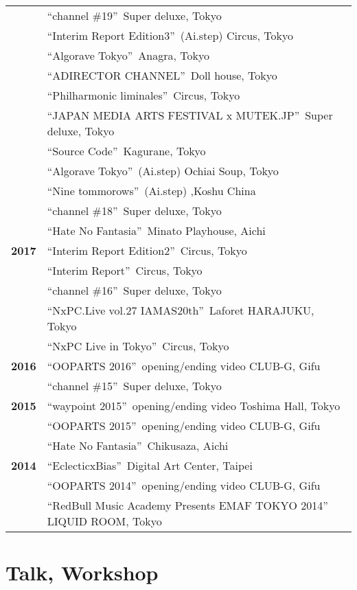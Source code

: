\documentclass[8pt,a4paper]{article}
\begin{document}
\begin{longtable}{@{}p{1.2cm}@{\hspace{0.5cm}}p{14cm}@{}}
& ``channel \#19''\, Super deluxe, Tokyo \\
& ``Interim Report Edition3''\, (Ai.step) Circus, Tokyo \\
& ``Algorave Tokyo''\, Anagra, Tokyo \\
& ``ADIRECTOR CHANNEL''\, Doll house, Tokyo \\
& ``Philharmonic liminales''\, Circus, Tokyo \\
& ``JAPAN MEDIA ARTS FESTIVAL x MUTEK.JP''\, Super deluxe, Tokyo \\
& ``Source Code''\, Kagurane, Tokyo \\
& ``Algorave Tokyo''\, (Ai.step) Ochiai Soup, Tokyo \\
& ``Nine tommorows''\, (Ai.step) ,Koshu China \\
& ``channel \#18''\, Super deluxe, Tokyo \\
& ``Hate No Fantasia''\, Minato Playhouse, Aichi \\[0.2em]
\textbf{2017} & ``Interim Report Edition2''\, Circus, Tokyo \\
& ``Interim Report''\, Circus, Tokyo \\
& ``channel \#16''\, Super deluxe, Tokyo \\
& ``NxPC.Live vol.27 IAMAS20th''\, Laforet HARAJUKU, Tokyo \\
& ``NxPC Live in Tokyo''\, Circus, Tokyo \\[0.2em]
\textbf{2016} & ``OOPARTS 2016''\, opening/ending video CLUB-G, Gifu \\
& ``channel \#15''\, Super deluxe, Tokyo \\[0.2em]
\textbf{2015} & ``waypoint 2015''\, opening/ending video Toshima Hall, Tokyo \\
& ``OOPARTS 2015''\, opening/ending video CLUB-G, Gifu \\
& ``Hate No Fantasia''\, Chikusaza, Aichi \\[0.2em]
\textbf{2014} & ``EclecticxBias''\, Digital Art Center, Taipei \\
& ``OOPARTS 2014''\, opening/ending video CLUB-G, Gifu \\
& ``RedBull Music Academy Presents EMAF TOKYO 2014''\, LIQUID ROOM, Tokyo \\
\end{longtable}

\section*{Talk, Workshop}
\end{document}
